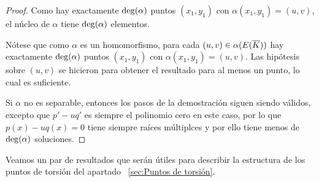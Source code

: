 \begin{proof}
	Como hay exactamente $\deg(\alpha)$ puntos $(x_1, y_1)$ con $\alpha(x_1, y_1) = (u, v)$, el núcleo de $\alpha$ tiene $\deg(\alpha)$ elementos.

	Nótese que como $\alpha$ es un homomorfismo, para cada $(u, v) \in \alpha(E(\overline{K}))$ hay exactamente $\deg(\alpha)$ puntos $(x_1, y_1)$ con $\alpha(x_1, y_1) = (u, v)$. Las hipótesis sobre $(u, v)$ se hicieron para obtener el resultado para al menos un punto, lo cual es suficiente.

	Si $\alpha$ no es separable, entonces los pasos de la demostración siguen siendo válidos, excepto que $p' - u q'$ es siempre el polinomio cero en este caso, por lo que $p(x) - u q(x) = 0$ tiene siempre raíces múltiplces y por ello tiene menos de $\deg(\alpha)$ soluciones.
\end{proof}

Veamos un par de resultados que serán útiles para describir la estructura de los puntos de torsión del apartado ~\ref{sec:Puntos de torsión}.

